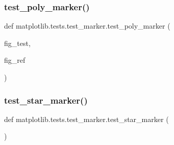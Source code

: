 \subsubsection{\texorpdfstring{test\+\_\+poly\+\_\+marker()}{test\_poly\_marker()}}
{\footnotesize\ttfamily def matplotlib.\+tests.\+test\+\_\+marker.\+test\+\_\+poly\+\_\+marker (\begin{DoxyParamCaption}\item[{}]{fig\+\_\+test,  }\item[{}]{fig\+\_\+ref }\end{DoxyParamCaption})}

\mbox{\label{namespacematplotlib_1_1tests_1_1test__marker_a8a4b6c8cacde3a03884608f6e3261dd3}} 
\subsubsection{\texorpdfstring{test\+\_\+star\+\_\+marker()}{test\_star\_marker()}}
{\footnotesize\ttfamily def matplotlib.\+tests.\+test\+\_\+marker.\+test\+\_\+star\+\_\+marker (\begin{DoxyParamCaption}{ }\end{DoxyParamCaption})}

